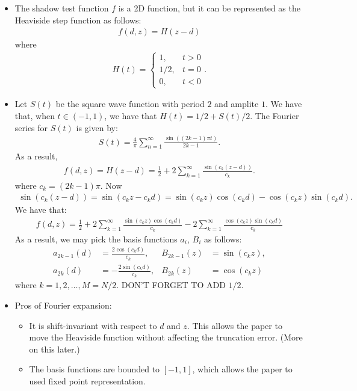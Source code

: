 \documentclass[10pt]{article}
\begin{document}
\begin{itemize}
  	\item The shadow test function $f$ is a 2D function, but it can be represented as the Heaviside step function as follows:
  	\begin{align*}
  		f(d,z) = H(z-d)
  	\end{align*}
  	where
  	\begin{align*}
  		H(t) = \begin{cases}
  			1, & t > 0 \\
  			1/2, & t = 0 \\
  			0, & t < 0
  		\end{cases}.
  	\end{align*}

  	\item Let $S(t)$ be the square wave function with period $2$ and amplite $1$.  We have that, when $t \in (-1,1)$, we have that $H(t) = 1/2 + S(t)/2$.  The Fourier series for $S(t)$ is given by:
  	\begin{align*}
  		S(t) = \frac{4}{\pi} \sum_{n=1}^\infty \frac{\sin((2k-1)\pi t)}{2k-1} .
  	\end{align*}
  	As a result,
  	\begin{align*}
  		f(d,z) = H(z-d) = \frac{1}{2} + 2 \sum_{k=1}^\infty \frac{\sin(c_k (z-d))}{c_k} .
  	\end{align*}
  	where $c_k = (2k-1)\pi$.  Now
  	\begin{align*}
  		\sin(c_k(z-d)) = \sin(c_k z - c_k d) = \sin(c_k z) \cos(c_k d) - \cos(c_k z) \sin(c_k d).
  	\end{align*}
  	We have that:
  	\begin{align*}
  		f(d,z) = \frac{1}{2} + 2\sum_{k=1}^\infty \frac{\sin(c_k z) \cos(c_k d)}{c_k} - 2\sum_{k=1}^\infty \frac{\cos(c_k z) \sin(c_k d)}{c_k}
  	\end{align*}
  	As a result, we may pick the basis functions $a_i$, $B_i$ as follows:
  	\begin{align*}
  		a_{2k-1}(d) &= \frac{2\cos(c_k d)}{c_k}, &
  		B_{2k-1}(z) &= \sin(c_k z), \\
  		a_{2k}(d) &= -\frac{2\sin(c_k d)}{c_k}, &
  		B_{2k}(z) &= \cos(c_k z)
  	\end{align*}
  	where $k = 1, 2, \dotsc, M=N/2$.  DON'T FORGET TO ADD $1/2$.

  	\item Pros of Fourier expansion:
  	\begin{itemize}
  		\item It is shift-invariant with respect to $d$ and $z$.  This allows the paper to move the Heaviside function without affecting the truncation error.  (More on this later.)
  		\item The basis functions are bounded to $[-1,1]$, which allows the paper to used fixed point representation.
  	\end{itemize}


\end{itemize}
\end{document}
